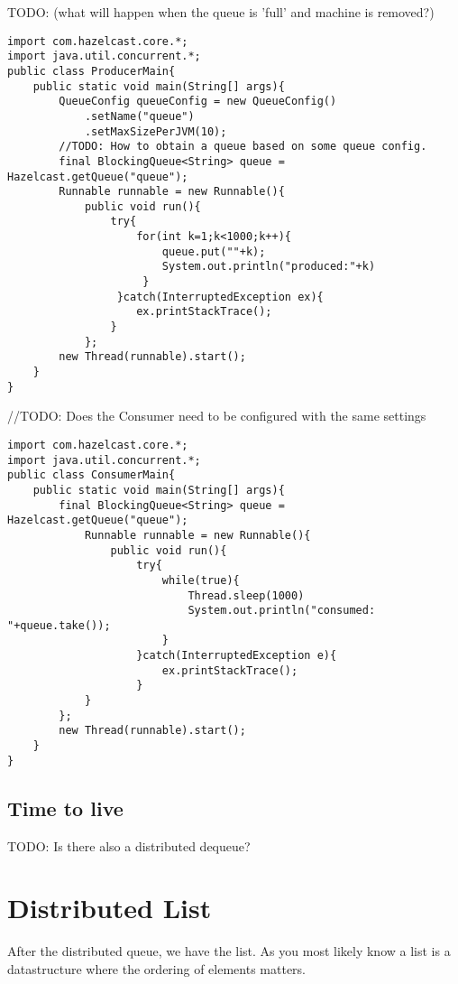 TODO: (what will happen when the queue is 'full' and machine is removed?) 

\begin{verbatim}
import com.hazelcast.core.*;
import java.util.concurrent.*;
public class ProducerMain{
    public static void main(String[] args){
        QueueConfig queueConfig = new QueueConfig()
            .setName("queue")
            .setMaxSizePerJVM(10);
        //TODO: How to obtain a queue based on some queue config.
        final BlockingQueue<String> queue = Hazelcast.getQueue("queue");
        Runnable runnable = new Runnable(){
            public void run(){
                try{
                    for(int k=1;k<1000;k++){
                        queue.put(""+k);
                        System.out.println("produced:"+k)
                     }
                 }catch(InterruptedException ex){
                    ex.printStackTrace();
                }
            };
        new Thread(runnable).start();
    }
}
\end{verbatim}

//TODO: Does the Consumer need to be configured with the same settings
\begin{verbatim}
import com.hazelcast.core.*;
import java.util.concurrent.*;
public class ConsumerMain{
    public static void main(String[] args){
        final BlockingQueue<String> queue = Hazelcast.getQueue("queue");
            Runnable runnable = new Runnable(){
                public void run(){
                    try{
                        while(true){
                            Thread.sleep(1000)
                            System.out.println("consumed: "+queue.take());
                        }
                    }catch(InterruptedException e){
                        ex.printStackTrace();
                    }
            }
        };
        new Thread(runnable).start();
    }
}
\end{verbatim}

\subsection{Time to live}
TODO: Is there also a distributed dequeue?

\section{Distributed List}

After the distributed queue, we have the list. As you most likely know a list is a 
datastructure where the ordering of elements matters. 


